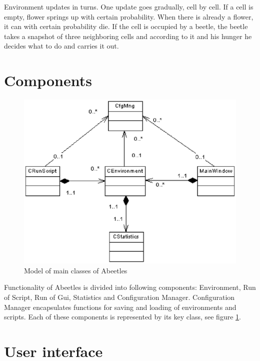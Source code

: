 \documentclass[a4paper,12pt]{report}
\begin{document}
Environment updates in turns. One update goes gradually, cell by cell. If a cell is empty, flower springs up with certain probability. When there is already a flower, it can with certain probability die. If the cell is occupied by a beetle, the beetle takes a snapshot of three neighboring cells and according to it and his hunger he decides what to do and carries it out. 


\section {Components}

\begin{figure}
\begin{center}
  \includegraphics [scale=0.8]{images/ComponentModel.eps} %
  \caption{Model of main classes of Abeetles}
  \label{img.ComponentModel}
\end{center}
\end{figure}

Functionality of Abeetles is divided into following components: Environment, Run of Script, Run of Gui, Statistics and Configuration Manager. Configuration Manager encapsulates functions for saving and loading of environments and scripts. Each of these components is  represented by its key class, see figure \ref {img.ComponentModel}.

\section {User interface}
\end{document}
